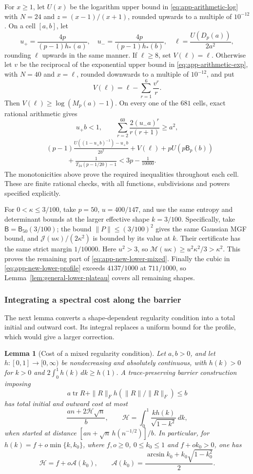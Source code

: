 \documentclass[11pt,a4paper]{article}
\numberwithin{equation}{section}
\newtheorem{lemma}[theorem]{Lemma}
\begin{document}
For $x\ge1$, let $U(x)$ be the logarithm upper bound in
\eqref{eq:app-arithmetic-log} with $N=24$ and $z=(x-1)/(x+1)$,
rounded upwards to a multiple of $10^{-12}$.
On a cell $[a,b]$, let
\[
 u_+=\frac{4p}{(p-1)h_*(a)},\quad
 u_-=\frac{4p}{(p-1)h_*(b)},\quad
 \ell=\frac{U(D_p(a))}{2a^2},
\]
rounding $\ell$ upwards in the same manner. If $\ell\ge8$, set
$V(\ell)=\ell$. Otherwise let $v$ be the reciprocal of the exponential
upper bound in \eqref{eq:app-arithmetic-exp}, with $N=40$ and $x=\ell$,
rounded downwards to a multiple of $10^{-12}$, and put
\[
 V(\ell)=\ell-\sum_{r=1}^{6}\frac{v^r}{r}.
\]
Then $V(\ell)\ge\log(M_p(a)-1)$.
On every one of the $681$ cells, exact rational arithmetic gives
\[
 u_+b<1,\qquad
 \sum_{r=2}^{60}\frac{2(u_-a)^r}{r(r+1)}\ge a^2,
\]
\[
 \begin{aligned}
 &(p-1)\frac{U((1-u_+b)^{-1})-u_+b}{2b^2}
      +V(\ell)+pU(p\mathsf B_p(b))\\
 &\hspace{3em}+\frac1{T_{24}(p-1/20)-1}<3p-\frac1{10000}.
 \end{aligned}
\]
The monotonicities above prove the required inequalities throughout
each cell. These are finite rational checks, with all functions,
subdivisions and powers specified explicitly.

For $0<\kappa\le3/100$, take $p=50$, $u=400/147$, and use the same
entropy and determinant bounds at the larger effective shape
$k=3/100$. Specifically, take $\mathsf B=\mathsf B_{50}(3/100)$;
the bound $\|P\|\le(3/100)^2$ gives the same Gaussian MGF bound,
and $\mathcal J(u\kappa)/(2\kappa^2)$ is bounded by its value at $k$.
Their certificate has the same strict margin $1/10000$.
Here $u^2>3$, so
$\mathcal M(u\kappa)\ge u^2\kappa^2/3>\kappa^2$.
This proves the remaining part of \eqref{eq:app-new-lower-mixed}.
Finally the cubic in \eqref{eq:app-new-lower-profile} exceeds
$4137/1000$ at $711/1000$, so Lemma~\ref{lem:general-lower-plateau} covers all remaining
shapes.

\subsubsection{Integrating a spectral cost along the barrier}
The next lemma converts a shape-dependent regularity condition into a
total initial and outward cost. Its integral replaces a uniform bound
for the profile, which would give a larger correction.

\begin{lemma}[Cost of a mixed regularity condition]\label{lem:app-mixed-cap-cost}
Let $a,b>0$, and let $h:[0,1]\to[0,\infty)$ be nondecreasing and
absolutely continuous, with $h(k)>0$ for $k>0$ and
$2\int_0^1h(k)\,dk\ge h(1)$.
A trace-preserving barrier construction imposing
\[
 a\operatorname{tr}R+\|R\|_Fh(\|R\|/\|R\|_F)\le b
\]
has total initial and outward cost at most
\[
 \frac{an+2\mathcal H\sqrt n}{b},\qquad
 \mathcal H=\int_0^1\frac{k h(k)}{\sqrt{1-k^2}}\,dk,
\]
when started at distance
$[an+\sqrt n\,h(n^{-1/2})]/b$.
In particular, for $h(k)=f+o\min\{k,k_0\}$, where
$f,o\ge0$, $0\le k_0\le1$ and $f+ok_0>0$, one has
\[
 \mathcal H=f+o\mathcal A(k_0),\qquad
 \mathcal A(k_0)=\frac{\arcsin k_0+k_0\sqrt{1-k_0^2}}2.
\]
\end{lemma}
\end{document}
